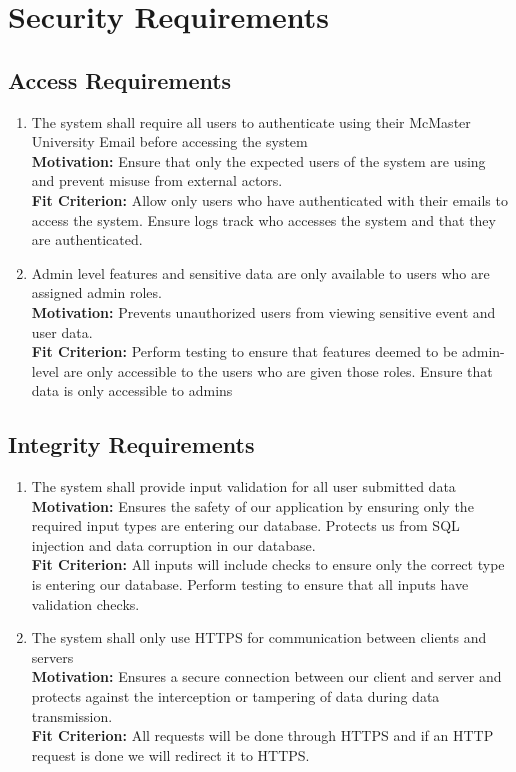 \documentclass[12pt]{article}
\begin{document}
\section{Security Requirements}
\subsection{Access Requirements}
\begin{enumerate}[align=left,
  leftmargin=*,
  labelsep=1em,
  itemindent=0em,
  label=\bfseries AC-\arabic*:]
  \item The system shall require all users to authenticate using their McMaster University Email before accessing the system \\[2mm]
    {\bf Motivation:} Ensure that only the expected users of the system are using and prevent misuse from external actors.  \\
    {\bf Fit Criterion:} Allow only users who have authenticated with their emails to access the system. Ensure logs track who accesses the system and that they are authenticated.
  \item Admin level features and sensitive data are only available to users who are assigned admin roles. \\ [2mm]
    {\bf Motivation:} Prevents unauthorized users from viewing sensitive event and user data.  \\
    {\bf Fit Criterion:} Perform testing to ensure that features deemed to be admin-level are only accessible to the users who are given those roles. Ensure that data is only accessible to admins
\end{enumerate}
\subsection{Integrity Requirements}
\begin{enumerate}[align=left,
  leftmargin=*,
  labelsep=1em,
  itemindent=0em,
  label=\bfseries IG-\arabic*:]
  \item The system shall provide input validation for all user submitted data \\[2mm]
    {\bf Motivation:} Ensures the safety of our application by ensuring only the required input types are entering our database. Protects us from SQL injection and data corruption in our database.  \\
    {\bf Fit Criterion:} All inputs will include checks to ensure only the correct type is entering our database. Perform testing to ensure that all inputs have validation checks.
  \item The system shall only use HTTPS for communication between clients and servers \\[2mm]
    {\bf Motivation:} Ensures a secure connection between our client and server and protects against the interception or tampering of data during data transmission. \\
    {\bf Fit Criterion:} All requests will be done through HTTPS and if an HTTP request is done we will redirect it to HTTPS. \\
\end{enumerate}
\end{document}
